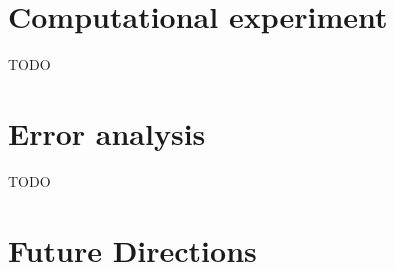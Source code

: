 \documentclass[14pt]{extarticle}
\begin{document}
%		
%		
%			
%			
%			
%			
%			
%			


	\section{Computational experiment}
	TODO
	
	\section{Error analysis}
	TODO
	
	\section{Future Directions}\label{sec:future}
	
\end{document}
